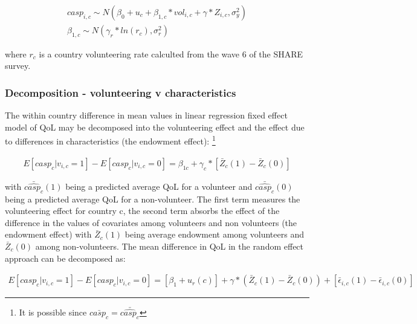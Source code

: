 \documentclass[10pt, letterpaper]{article}
\begin{document}
\begin{spacing}{1.4}
 \begin{eqnarray}
  \label{eq:casp_mlm}
	casp_{i,c}\sim N(\beta_{0}+ u_{c} +  \beta_{1,c} * vol_{i,c}+\gamma*Z_{i,c},\sigma^{2}_{y}) \\	
	\beta_{1,c} \sim N(\gamma_{r}*ln(r_{c}),\sigma^{2}_{r})
 \end{eqnarray}
 
where $r_{c}$ is a country volunteering rate calculted from the wave 6 of the SHARE survey. 




\subsubsection*{Decomposition - volunteering v characteristics}


The within country difference in mean values in linear regression fixed effect model of QoL  may be decomposed into the volunteering effect and the effect due to differences in characteristics (the endowment effect): \footnote{It is possible since $\bar{casp_{c}} = \bar{\hat{casp_c}}$} 

 \begin{eqnarray}
 \label{eq:casp_ols}
E[casp_{c}|v_{i,c}=1] - E[casp_{c}|v_{i,c}=0]= \beta_{1c}+ \gamma_{c}*[\bar{Z}_{c}(1)-\bar{Z}_{c}(0)]
 \end{eqnarray}

with $\bar{\hat{casp_{c}}}(1)$ being a predicted average QoL for a volunteer and $\bar{\hat{casp_{c}}}(0)$ being a predicted average QoL for a non-volunteer.  The first term measures the volunteering effect for country c, the second term absorbs the effect of the difference in the values of covariates among volunteers and non volunteers (the endowment effect) with $\bar{Z}_{c}(1)$ being average endowment among volunteers and $\bar{Z}_{c}(0)$ among non-volunteers. The mean difference in QoL in the random effect approach can be decomposed as: 

 \begin{eqnarray}
 \label{eq:decomp_mlm}
E[casp_{c}|v_{i,c}=1]-E[casp_{c}|v_{i,c}=0]= [\beta_{1}+u_{r}(c)]+ \gamma*(\bar{Z}_{c}(1)-\bar{Z}_{c}(0))+ [\bar{\epsilon}_{i,c}(1)-\bar{\epsilon}_{i,c}(0)]
 \end{eqnarray}


\end{spacing}
\end{document}
